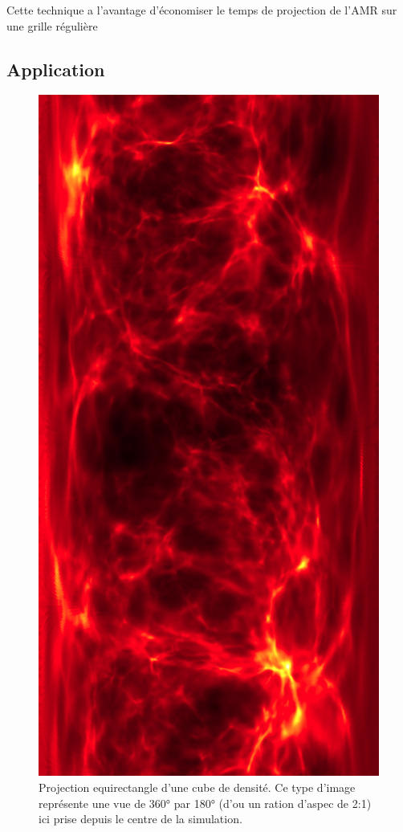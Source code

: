 Cette technique a l'avantage d'économiser le temps de projection de l'AMR sur une grille régulière


\subsection{Application}


\begin{figure}[bth]
        \includegraphics[height=.95\textheight]{img/04/equi.png} 
        \caption{Projection equirectangle d'une cube de densité.
        Ce type d'image représente une vue de 360° par 180° (d'ou un ration d'aspec de 2:1) ici prise depuis le centre de la simulation.}
 		\label{fig:equirectangle}
\end{figure}


